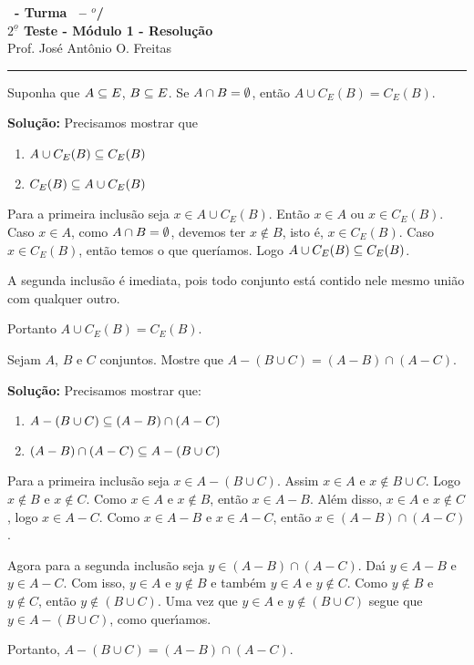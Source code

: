 \documentclass[12pt]{exam}
\begin{document}
\begin{center}
{\Large\bf \disciplina\ - Turma \turma\ -- \semestre$^{o}$/\ano} \\ \vspace{9pt} {\large\bf
$2^{\underline{o}}$ Teste - M\'odulo 1 - Resolu\c{c}\~ao}\\
\vspace{9pt} Prof. Jos{\'e} Ant{\^o}nio O. Freitas
\end{center}
\hrule

\vspace{.6cm}

\questao Suponha que $A \subseteq E$, $B \subseteq E$. Se $A \cap B = \emptyset$, então $A \cup C_E(B) = C_E(B)$.

\noindent\textbf{Solu\c{c}\~ao:} Precisamos mostrar que
\begin{enumerate}[label={\roman*})]
    \item $A \cup C_E(B) \subseteq C_E(B)$
    \item $C_E(B) \subseteq A \cup C_E(B)$
\end{enumerate}

Para a primeira inclusão seja $x \in A \cup C_E(B)$. Então $x \in A$ ou $x \in C_E(B)$. Caso $x \in A$, como $A \cap B = \emptyset$, devemos ter $x \notin B$, isto é, $x \in C_E(B)$. Caso $x \in C_E(B)$, então temos o que queríamos. Logo $A \cup C_E(B) \subseteq C_E(B)$.

A segunda inclusão é imediata, pois todo conjunto está contido nele mesmo união com qualquer outro.

Portanto $A \cup C_E(B) = C_E(B)$.

\vspace{.5cm}

\questao Sejam $A$, $B$ e $C$ conjuntos. Mostre que $A - (B \cup C) = (A - B) \cap (A - C)$.

\noindent\textbf{Solu\c{c}\~ao:} Precisamos mostrar que:
\begin{enumerate}[label={\roman*})]
	\item $A - (B \cup C) \subseteq (A - B) \cap (A - C)$
	\item $(A - B) \cap (A - C) \subseteq A - (B \cup C)$
\end{enumerate}

Para a primeira inclus\~ao seja $x \in A - (B \cup C)$. Assim $x \in A$ e $x \notin B \cup C$. Logo $x \notin B$ e $x \notin C$. Como $x \in A$ e $x \notin B$, ent\~ao $x \in A - B$. Al\'em disso, $x \in A$ e $x \notin C$, logo $x \in A - C$. Como $x \in A - B$ e $x \in A - C$, ent\~ao $x \in (A - B) \cap (A - C)$.

Agora para a segunda inclus\~ao seja $y \in (A - B) \cap (A - C)$. Da{\'\i} $y \in A - B$ e $y \in A - C$. Com isso, $y \in A$ e $y \notin B$ e tamb\'em $y \in A$ e $y \notin C$. Como $y \notin B$ e $y \notin C$, ent\~ao $y \notin (B \cup C)$. Uma vez que $y \in A$ e $y \notin (B \cup C)$ segue que $y \in A - (B \cup C)$, como quer{\'\i}amos.

Portanto, $A - (B \cup C) = (A - B) \cap (A - C)$.
\end{document}
